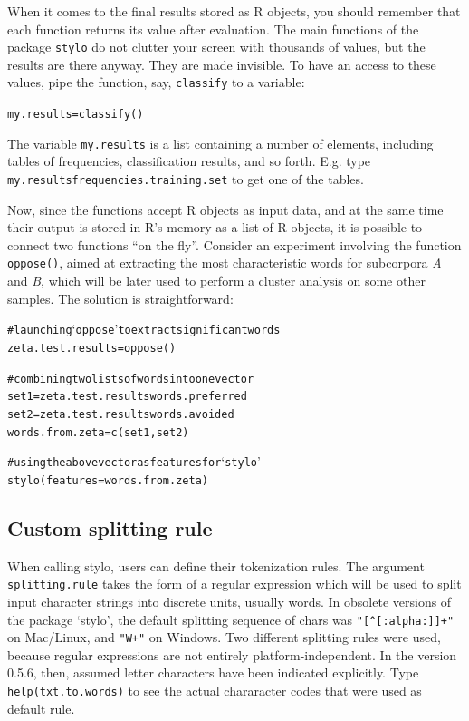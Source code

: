 \documentclass[11pt,a4paper]{article}
\def\underscore{\raisebox{-.8ex}{-}}
\def\code#1{{\tt #1}}
\begin{document}
When it comes to the final results stored as R objects, you should remember that each function returns its value after evaluation. The main functions of the package \code{stylo} do not clutter your screen with thousands of values, but the results are there anyway. They are made invisible. To have an access to these values, pipe the function, say, \code{classify} to a variable:

\begin{alltt}
    my.results = classify()
\end{alltt}

The variable \code{my.results} is a list containing a number of elements, including tables of frequencies, classification results, and so forth. E.g. type \code{my.resultsfrequencies.training.set} to get one of the tables.

Now, since the functions accept R objects as input data, and at the same time their output is stored in R's memory as a list of R objects, it is possible to connect two functions ``on the fly''. Consider an experiment involving the function \code{oppose()}, aimed at extracting the most characteristic words for subcorpora \textit{A} and \textit{B}, which will be later used to perform a cluster analysis on some other samples. The solution is straightforward:

\begin{alltt}
    # launching `oppose' to extract significant words
    zeta.test.results = oppose()

    # combining two lists of words into one vector
    set1 = zeta.test.resultswords.preferred
    set2 = zeta.test.resultswords.avoided    
    words.from.zeta = c(set1, set2)

    # using the above vector as features for `stylo'
    stylo(features = words.from.zeta)
\end{alltt}


\subsection{Custom splitting rule}

When calling stylo, users can define their tokenization rules. The argument \code{splitting.rule} takes the form of a regular expression which will be used to split input character strings into discrete units, usually words. In obsolete versions of the package ‘stylo’, the default splitting sequence of chars was \code{"[\^{}[:alpha:]]+"} on Mac/Linux, and \code{"\symbol{92}W+\underscore"} on Windows. Two different splitting rules were used, because regular expressions are not entirely platform-independent. In the version 0.5.6, then, assumed letter characters have been indicated explicitly. Type \code{help(txt.to.words)} to see the actual chararacter codes that were used as default rule.
\end{document}
